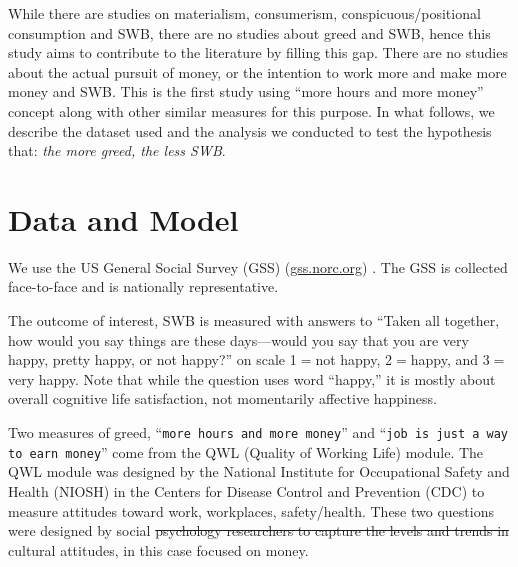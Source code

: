 \documentclass[10pt, letterpaper]{article}
\providecommand{\DIFaddtex}[1]{{\protect\color{blue}\uwave{#1}}} %
\providecommand{\DIFdeltex}[1]{{\protect\color{red}\sout{#1}}}                      %
\providecommand{\DIFaddbegin}{} %
\providecommand{\DIFaddend}{} %
\providecommand{\DIFdelbegin}{} %
\providecommand{\DIFdelend}{} %
\providecommand{\DIFadd}[1]{\texorpdfstring{\DIFaddtex{#1}}{#1}} %
\providecommand{\DIFdel}[1]{\texorpdfstring{\DIFdeltex{#1}}{}} %
\newcommand{\DIFscaledelfig}{0.5}
\newlength{\DIFdelgraphicswidth} %
\newlength{\DIFdelgraphicsheight} %
\newcommand{\DIFaddincludegraphics}[2][]{{\color{blue}\fbox{\DIFOincludegraphics[#1]{#2}}}} %
\newcommand{\DIFdelincludegraphics}[2][]{%
\sbox{\DIFdelgraphicsbox}{\DIFOincludegraphics[#1]{#2}}%
\settoboxwidth{\DIFdelgraphicswidth}{\DIFdelgraphicsbox} %
\settoboxtotalheight{\DIFdelgraphicsheight}{\DIFdelgraphicsbox} %
\scalebox{\DIFscaledelfig}{%
\parbox[b]{\DIFdelgraphicswidth}{\usebox{\DIFdelgraphicsbox}\\[-\baselineskip] \rule{\DIFdelgraphicswidth}{0em}}\llap{\resizebox{\DIFdelgraphicswidth}{\DIFdelgraphicsheight}{%
\setlength{\unitlength}{\DIFdelgraphicswidth}%
\begin{picture}(1,1)%
\thicklines\linethickness{2pt} %
{\color[rgb]{1,0,0}\put(0,0){\framebox(1,1){}}}%
{\color[rgb]{1,0,0}\put(0,0){\line( 1,1){1}}}%
{\color[rgb]{1,0,0}\put(0,1){\line(1,-1){1}}}%
\end{picture}%
}\hspace*{3pt}}} %
} %
\DeclareRobustCommand{\DIFaddbegin}{\DIFOaddbegin \let\includegraphics\DIFaddincludegraphics} %
\DeclareRobustCommand{\DIFaddend}{\DIFOaddend \let\includegraphics\DIFOincludegraphics} %
\DeclareRobustCommand{\DIFdelbegin}{\DIFOdelbegin \let\includegraphics\DIFdelincludegraphics} %
\DeclareRobustCommand{\DIFdelend}{\DIFOaddend \let\includegraphics\DIFOincludegraphics} %
\begin{document}
\begin{spacing}{1.8}
While there are studies on materialism, consumerism,
conspicuous/positional consumption and SWB, there are no studies about  %
greed %
and SWB, hence this study aims to contribute to the literature by filling this gap. 
There are no studies about the actual pursuit of money, or the intention to work
more and make more money and SWB. This is the first study using ``more hours and
more money'' concept along with other similar measures for this purpose. In what
follows, we describe the dataset used and the analysis we conducted to %
test the hypothesis that: \textit{the more greed, the less SWB}. 

\section{Data and Model}

We use the US General Social Survey (GSS) (\url{gss.norc.org})%
. The GSS is collected face-to-face and is nationally
representative. %

The outcome of interest, SWB is measured with answers to ``Taken all together, how would you say things are these days---would you say that you are very happy,
pretty happy, or not happy?'' on scale  1$=$not happy, 2$=$happy, and 3$=$very happy. 
%
Note that while the question uses word ``happy,'' it is mostly about overall
cognitive life satisfaction, not momentarily affective happiness.

Two measures of greed, ``\texttt{more hours and more money}'' and  ``\texttt{job is just a way to earn money}'' come from the QWL (Quality of Working Life) module. The QWL module was designed by the National Institute for Occupational Safety and Health (NIOSH) in the Centers for Disease Control and Prevention (CDC) to measure attitudes toward work, workplaces,
safety/health. These two questions  were designed by social \DIFdelbegin \DIFdel{psychology researchers to capture the levels and trends in }\DIFdelend \DIFaddbegin \DIFadd{psychologists to capture }\DIFaddend cultural attitudes, in this case focused on money. 


\end{spacing}
\end{document}
